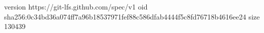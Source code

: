 version https://git-lfs.github.com/spec/v1
oid sha256:0c34bd36a074ff7a96b18537971fef88c586dfab4444f5c8fd76718b4616ee24
size 130439
